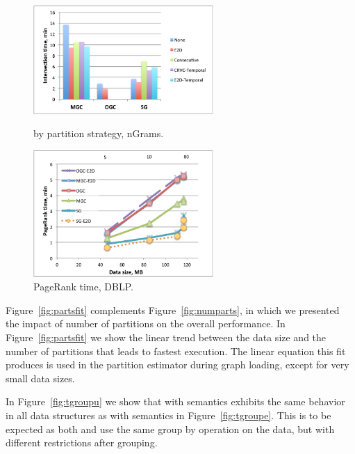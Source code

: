 \begin{figure}[t!]
\centering
\begin{minipage}{3in}
  \centering
  \includegraphics[width=2.7in]{figs/tand_parts.pdf}
\vspace{-0.1in}
  \caption{ by partition strategy, nGrams.}
  \label{fig:tand_parts}
\vspace{-0.1in}
\end{minipage}
\begin{minipage}{3in}
  \centering
  \includegraphics[width=2.7in]{figs/pagerank_dblp.pdf}
\vspace{-0.1in}
  \caption{PageRank time, DBLP.}
  \label{fig:pagerank_dblp}
\vspace{-0.1in}
\end{minipage}
\end{figure}

Figure~\ref{fig:partsfit} complements Figure~\ref{fig:numparts}, in
which we presented the impact of number of partitions on the overall
performance.  In Figure~\ref{fig:partsfit} we show the linear trend
between the data size and the number of partitions that leads to
fastest execution.  The linear equation this fit produces is used in
the partition estimator during graph loading, except for very small
data sizes.

In Figure~\ref{fig:tgroupu} we show that  with
 semantics exhibits the same behavior in all data
structures as  with  semantics in
Figure~\ref{fig:tgroupe}.  This is to be expected as both 
and  use the same group by operation on the data, but with
different restrictions after grouping.

